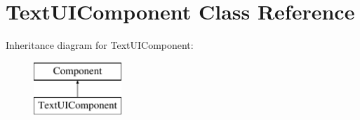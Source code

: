 \hypertarget{class_text_u_i_component}{}\section{Text\+U\+I\+Component Class Reference}
\label{class_text_u_i_component}
Inheritance diagram for Text\+U\+I\+Component\+:\begin{figure}[H]
\begin{center}
\leavevmode
\includegraphics[height=2.000000cm]{class_text_u_i_component}
\end{center}
\end{figure}
